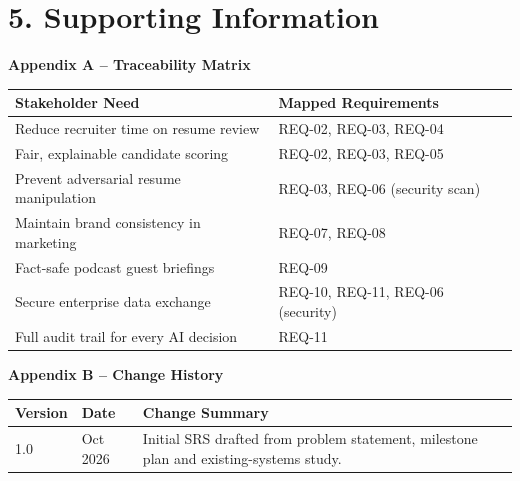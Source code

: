 \vspace{16pt}
\section*{5. Supporting Information}

\noindent\textbf{Appendix A -- Traceability Matrix}

\renewcommand{\arraystretch}{1.12}
\noindent\begin{tabular}{|p{}|p{}|}
\hline
\textbf{Stakeholder Need} & \textbf{Mapped Requirements} \\ \hline
Reduce recruiter time on resume review & REQ-02, REQ-03, REQ-04 \\ \hline
Fair, explainable candidate scoring & REQ-02, REQ-03, REQ-05 \\ \hline
Prevent adversarial resume manipulation & REQ-03, REQ-06 (security scan) \\ \hline
Maintain brand consistency in marketing & REQ-07, REQ-08 \\ \hline
Fact-safe podcast guest briefings & REQ-09 \\ \hline
Secure enterprise data exchange & REQ-10, REQ-11, REQ-06 (security) \\ \hline
Full audit trail for every AI decision & REQ-11 \\ \hline
\end{tabular}

\vspace{10pt}
\noindent\textbf{Appendix B -- Change History}

\noindent\begin{tabular}{|p{}|p{}|p{}|}
\hline
\textbf{Version} & \textbf{Date} & \textbf{Change Summary} \\ \hline
1.0 & Oct 2026 & Initial SRS drafted from problem statement, milestone plan and existing-systems study. \\ \hline
\end{tabular}
